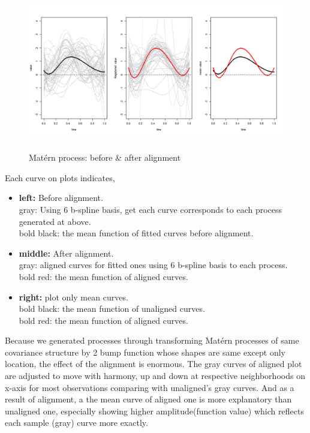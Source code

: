 \documentclass{article}
\begin{document}
\begin{figure}[hh]
    \centering
    \includegraphics[height=7cm]{matern_align_compare.png}
    \caption{Mat\'{e}rn process: before \& after alignment}
\end{figure}
Each curve on plots indicates,
\begin{itemize}
    \item{\textbf{left:} Before alignment. \\
    gray: Using 6 b-spline basis, get each curve corresponds to each process generated at above.\\
    bold black: the mean function of fitted curves before alignment.}
    \item{\textbf{middle:} After alignment. \\
    gray: aligned curves for fitted ones using 6 b-spline basis to each process.\\
    bold red: the mean function of aligned curves.}
    \item{\textbf{right:} plot only mean curves.\\
    bold black: the mean function of unaligned curves.\\
    bold red: the mean function of aligned curves.}
\end{itemize}


Because we generated processes through transforming Mat\'{e}rn processes of same covariance structure 
by 2 bump function whose shapes are same except only location, the effect of the alignment is enormous.
The gray curves of aligned plot are adjusted to move with harmony, up and down at respective neighborhoods on x-axis for most observations
comparing with unaligned's gray curves. And as a result of alignment, a the mean curve of aligned one is more explanatory than unaligned one, 
especially showing higher amplitude(function value) which reflects each sample (gray) curve more exactly.
\end{document}
